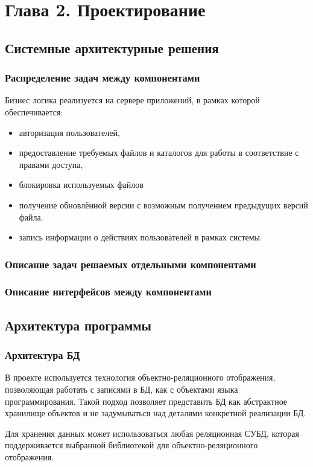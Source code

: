\documentclass[utf8,usehyperref,12pt]{G7-32}
\begin{document}
\chapter{Глава 2. Проектирование}
\section{Системные архитектурные решения}
\subsection{Распределение задач между компонентами}
Бизнес логика реализуется на сервере приложений, в рамках которой обеспечивается:
\begin{itemize}

\item авторизация пользователей, 
\item предоставление требуемых файлов и каталогов для работы в соответствие с правами доступа, 
\item блокировка используемых файлов 
\item получение обновлённой версии с возможным получением предыдущих версий файла.
\item запись информации о действиях пользователей в рамках системы
 \end{itemize}
\subsection{Описание задач решаемых отдельными компонентами}
\subsection{Описание интерфейсов между компонентами}

\section{Архитектура программы}
\subsection{Архитектура БД}

В проекте используется технология объектно-реляционного отображения, позволяющая работать с записями в БД, как с объектами языка программирования. Такой подход позволяет представить БД как абстрактное хранилище объектов и не задумываться над деталями конкретной реализации БД.

Для хранения данных может использоваться любая реляционная СУБД, которая поддерживается выбранной библиотекой для объектно-реляционного отображения.
\end{document}
